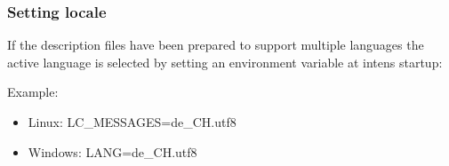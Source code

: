 \subsubsection{Setting locale}
If the description files have been prepared to support multiple languages
the active language is selected by setting an environment variable
at intens startup:

\label{sec:locale}

Example:
\begin{itemize}
\item Linux: LC\_MESSAGES=de\_CH.utf8
\item Windows: LANG=de\_CH.utf8
\end{itemize}
